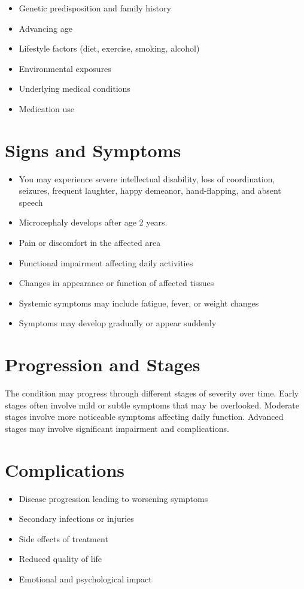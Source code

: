 \begin{itemize}[noitemsep]
  \item Genetic predisposition and family history
  \item Advancing age
  \item Lifestyle factors (diet, exercise, smoking, alcohol)
  \item Environmental exposures
  \item Underlying medical conditions
  \item Medication use
\end{itemize}
\section{Signs and Symptoms}
\begin{itemize}[noitemsep]
  \item You may experience severe intellectual disability, loss of coordination, seizures, frequent laughter, happy demeanor, hand-flapping, and absent speech
  \item Microcephaly develops after age 2 years.
  \item Pain or discomfort in the affected area
  \item Functional impairment affecting daily activities
  \item Changes in appearance or function of affected tissues
  \item Systemic symptoms may include fatigue, fever, or weight changes
  \item Symptoms may develop gradually or appear suddenly
\end{itemize}
\section{Progression and Stages}
The condition may progress through different stages of severity over time. Early stages often involve mild or subtle symptoms that may be overlooked. Moderate stages involve more noticeable symptoms affecting daily function. Advanced stages may involve significant impairment and complications.
\section{Complications}
\begin{itemize}[noitemsep]
  \item Disease progression leading to worsening symptoms
  \item Secondary infections or injuries
  \item Side effects of treatment
  \item Reduced quality of life
  \item Emotional and psychological impact
\end{itemize}
